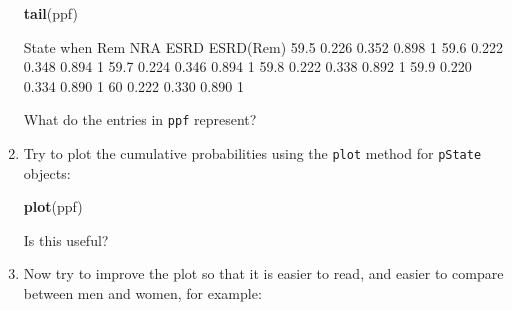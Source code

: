 \documentclass[
]{book}
\newenvironment{Shaded}{\begin{snugshade}}{\end{snugshade}}
\newcommand{\FunctionTok}[1]{\textcolor[rgb]{0.13,0.29,0.53}{\textbf{#1}}}
\newcommand{\NormalTok}[1]{#1}
\begin{document}
\begin{enumerate}
\begin{Shaded}
\begin{Highlighting}[]
\FunctionTok{tail}\NormalTok{(ppf)}
\end{Highlighting}
\end{Shaded}

\begin{Shaded}
\begin{Highlighting}[]
\NormalTok{      State}
\NormalTok{when     Rem   NRA  ESRD ESRD(Rem)}
\NormalTok{  59.5 0.226 0.352 0.898         1}
\NormalTok{  59.6 0.222 0.348 0.894         1}
\NormalTok{  59.7 0.224 0.346 0.894         1}
\NormalTok{  59.8 0.222 0.338 0.892         1}
\NormalTok{  59.9 0.220 0.334 0.890         1}
\NormalTok{  60   0.222 0.330 0.890         1}
\end{Highlighting}
\end{Shaded}

  What do the entries in \texttt{ppf} represent?
\item
  Try to plot the cumulative probabilities using the \texttt{plot} method
  for \texttt{pState} objects:

\begin{Shaded}
\begin{Highlighting}[]
\FunctionTok{plot}\NormalTok{(ppf)}
\end{Highlighting}
\end{Shaded}

  Is this useful?
\item
  Now try to improve the plot so that it is easier to read, and
  easier to compare between men and women, for example:


\end{enumerate}
\end{document}
